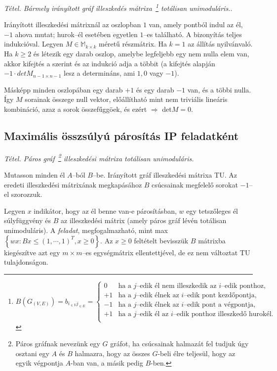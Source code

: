 \emph{Tétel. Bármely irányított gráf illeszkedés mátrixa~\footnote{$
			B(G_{(V,E)})=
			b_{i_{\in V}j_{\in E}}=
			\begin{cases}
				0  & \text{ha a } j \text{--edik él nem illeszkedik az } i \text{--edik ponthoz,}    \\
				+1 & \text{ha a } j \text{--edik élnek az } i \text{--edik pont kezdőpontja,}        \\
				-1 & \text{ha a } j \text{--edik élnek az } i \text{--edik pont a végpontja,}        \\
				+1 & \text{ha a } j \text{--edik él az } i \text{--edik ponthoz illeszkedő hurokél.} \\
			\end{cases}$} totálisan unimoduláris.}.
\vspace{0.4cm}

Irányított illeszkedési mátrixnál az oszlopban $1$ van, amely pontból indul az
él, $-1$ ahova mutat; hurok--él esetében egyetlen $1$--es található. A
bizonyítás teljes indukcióval. Legyen $M \in \mathbb{M}_{k\times k}$ méretű
részmátrix. Ha $k=1$ az állítás nyilvánvaló. Ha $k \geq 2$ és létezik egy darab
oszlop, amelybe legfeljebb egy nem nulla elem van, akkor kifejtés a szerint és
az indukció adja a többit (a kifejtés alapján $-1\cdot detM_{n-1\times n-1}$
lesz a determináns, ami $1,0$ vagy $-1$).

Másképp minden oszlopában egy darab $+1$ és egy darab $-1$ van, és a többi
nulla. Így $M$ sorainak összege null vektor, előállítható mint nem triviális
lineáris kombináció, azaz a sorok összefűggöek, és ezért $\Rightarrow$ det$M=0$.

\subsection{Maximális összsúlyú párosítás IP feladatként}

\emph{Tétel. Páros gráf~\footnote{Páros gráfnak nevezünk egy $G$ gráfot, ha
		csúcsainak halmazát fel tudjuk úgy osztani egy $A$ és $B$ halmazra, hogy az
		összes $G$-beli élre teljesül, hogy az egyik végpontja $A$-ban van, a másik
		pedig $B$-ben.} illeszkedési mátrixa totálisan unimoduláris.}
\vspace{0.4cm}

Mutasson minden él $A$--ból $B$--be. Irányított gráf illeszkedési mátrixa TU. Az
eredeti illeszkedési mátrixának megkapásához $B$ csúcsainak megfelelő sorokat
$-1$--el szorozzuk.

Legyen $x$ indikátor, hogy az él benne van-e párosításban, $w$ egy tetszőleges
él súlyfüggvény és $B$ az illeszkedési mátrix (amely páros gráf lévén totálisan
unimoduláris). A \emph{feladat}, megfogalmazható, mint max$\left\{ wx:Bx \leq (1,
	\cdots, 1)^T, x \geq 0 \right\}$. Az $x \geq 0 $ feltételt bevisszük $B$
mátrixba kiegészítve azt egy $m \times m$--es egységmátrix ellentettjével, de ez
nem változtat TU tulajdonságon.


